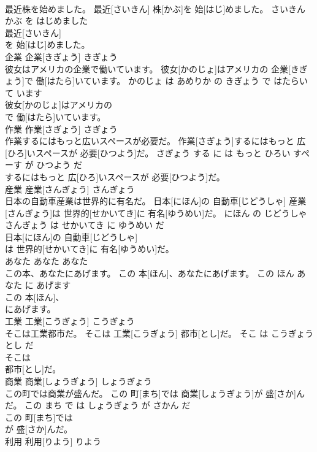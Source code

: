 \documentclass[8pt]{extreport}
\begin{document}
\begin{CJK}{UTF8}{min}
\\	最近株を始めました。	最近[さいきん] 株[かぶ]を 始[はじ]めました。	さいきん かぶ を はじめました	
\\	最近[さいきん]
\\	を 始[はじ]めました。		
\\	企業	企業[きぎょう]	きぎょう	
\\	彼女はアメリカの企業で働いています。	彼女[かのじょ]はアメリカの 企業[きぎょう]で 働[はたら]いています。	かのじょ は あめりか の きぎょう で はたらいて います	
\\	彼女[かのじょ]はアメリカの
\\	で 働[はたら]いています。		
\\	作業	作業[さぎょう]	さぎょう	
\\	作業するにはもっと広いスペースが必要だ。	作業[さぎょう]するにはもっと 広[ひろ]いスペースが 必要[ひつよう]だ。	さぎょう する に は もっと ひろい すぺーす が ひつよう だ	
\\	するにはもっと 広[ひろ]いスペースが 必要[ひつよう]だ。		
\\	産業	産業[さんぎょう]	さんぎょう	
\\	日本の自動車産業は世界的に有名だ。	日本[にほん]の 自動車[じどうしゃ] 産業[さんぎょう]は 世界的[せかいてき]に 有名[ゆうめい]だ。	にほん の じどうしゃ さんぎょう は せかいてき に ゆうめい だ	
\\	日本[にほん]の 自動車[じどうしゃ]
\\	は 世界的[せかいてき]に 有名[ゆうめい]だ。		
\\	あなた	あなた	あなた	
\\	この本、あなたにあげます。	この 本[ほん]、あなたにあげます。	この ほん あなた に あげます	
\\	この 本[ほん]、
\\	にあげます。		
\\	工業	工業[こうぎょう]	こうぎょう	
\\	そこは工業都市だ。	そこは 工業[こうぎょう] 都市[とし]だ。	そこ は こうぎょう とし だ	
\\	そこは
\\	都市[とし]だ。		
\\	商業	商業[しょうぎょう]	しょうぎょう	
\\	この町では商業が盛んだ。	この 町[まち]では 商業[しょうぎょう]が 盛[さか]んだ。	この まち で は しょうぎょう が さかん だ	
\\	この 町[まち]では
\\	が 盛[さか]んだ。		
\\	利用	利用[りよう]	りよう	

\end{CJK}
\end{document}

